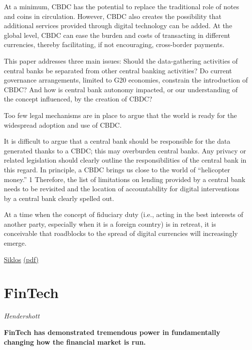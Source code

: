 \documentclass[
]{book}
\begin{document}
At a minimum,
CBDC has the potential to replace the traditional
role of notes and coins in circulation. However,
CBDC also creates the possibility that additional
services provided through digital technology
can be added. At the global level, CBDC can ease
the burden and costs of transacting in different
currencies, thereby facilitating, if not encouraging,
cross-border payments.

This paper addresses three main issues: Should
the data-gathering activities of central banks be
separated from other central banking activities?
Do current governance arrangements, limited
to G20 economies, constrain the introduction
of CBDC? And how is central bank autonomy
impacted, or our understanding of the concept
influenced, by the creation of CBDC?

Too few legal mechanisms are in place to argue that
the world is ready for the widespread adoption
and use of CBDC.

It is difficult to argue that a central bank
should be responsible for the data generated
thanks to a CBDC; this may overburden central
banks. Any privacy or related legislation should
clearly outline the responsibilities of the central
bank in this regard. In principle, a CBDC brings
us close to the world of ``helicopter money.'' 1
Therefore, the list of limitations on lending
provided by a central bank needs to be revisited
and the location of accountability for digital
interventions by a central bank clearly spelled out.

At a time when
the concept of fiduciary duty (i.e., acting in the best
interests of another party, especially when it is a
foreign country) is in retreat, it is conceivable that
roadblocks to the spread of digital currencies will
increasingly emerge.

\href{https://www.cigionline.org/publications/central-bank-digital-currency-and-governance-fit-purpose}{Siklos}
\href{pdf/Siklos_2021_Central_Bank_Digital_Currency.pdf}{(pdf)}

\hypertarget{fintech}{%
\chapter{FinTech}\label{fintech}}

\emph{Hendershott}

\textbf{FinTech has demonstrated tremendous power in fundamentally changing
how the financial market is run.}
\end{document}

